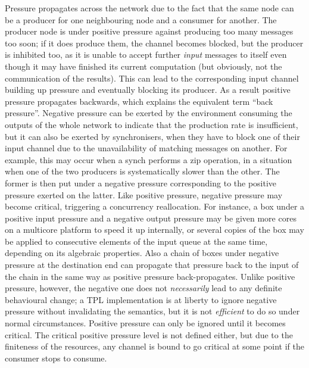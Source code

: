 \documentclass[11pt]{report}
\begin{document}
Pressure propagates across the network due to the fact that the same node can be a producer for one neighbouring node and a consumer for another. The producer node is under positive pressure against producing too many messages too soon; if it does produce them, the channel becomes blocked,
but the producer is inhibited too, as it is unable to accept further {\em input} messages to itself even though it may have finished its current
computation (but obviously, not the communication of the results).
This can lead to the corresponding input channel building up pressure and eventually blocking its producer. As a result positive pressure
propagates backwards, which explains the equivalent term ``back pressure''. Negative pressure can be exerted by the environment consuming
the outputs of the whole network to indicate that the production rate is insufficient, but it can also be exerted
by synchronisers, when they have to block one of their input channel due to the unavailability of matching messages on another.
For example, this may occur when a synch performs a zip operation, in a situation when one of the two producers is
systematically slower than the other. The former is then put under a negative pressure corresponding to the positive pressure exerted on the latter.
Like positive pressure, negative pressure may become critical,  triggering a concurrency reallocation. For instance, a box under
a positive input pressure and a negative output pressure may be given more cores on a multicore platform to speed it up internally, or several
copies of the box may be applied to consecutive elements of the input queue at the same time, depending on its algebraic properties.
Also a chain of boxes under negative pressure at the destination end can propagate that pressure back to the input of the chain in the same way
as positive pressure back-propagates. Unlike positive pressure, however, the negative one does not {\em necessarily} lead to any
definite behavioural change; a TPL implementation is at liberty to ignore negative pressure without invalidating the semantics, but it is not {\em efficient}
to do so under normal circumstances. Positive pressure can only be ignored until it becomes critical. The critical positive pressure level
is not defined either, but due to the finiteness of the resources, any channel is bound to go critical at some point if the consumer stops
to consume.
\end{document}
